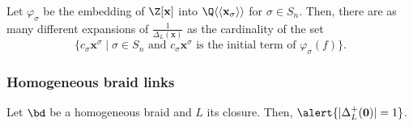 \documentclass[11pt,e-only]{amsart}
\begin{document}

\begin{proposition} Let $\varphi_\sigma$ be the embedding of $\Z[\mathbf{x}]$ into $\Q\langle\langle \mathbf{x}_\sigma \rangle\rangle$ for $\sigma\in S_n$. Then, there are as many different expansions of $\frac{1}{\Delta_L(\mathbf{x})}$ as the cardinality of the set \[\{c_\sigma \mathbf{x}^\sigma \mid \sigma\in S_n\text{ and } c_\sigma \mathbf{x}^\sigma \text{ is the initial term of }\varphi_\sigma(f)\}.\]
\end{proposition}

\subsubsection{Homogeneous braid links}

\begin{proposition} Let $\bd$ be a homogeneous braid and $L$ its closure. Then, $\alert{|\Delta^+_L(\mathbf{0})| = 1}$. 
\end{proposition}
\end{document}
